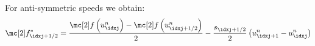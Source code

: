 \begin{corbox}\nospacing
    \begin{cor}[\hfill\tcblack{$-s^{l}_{\idxj+1/2}=s^{r}_{\idxj+1/2}=:s_{\idxj+1/2}$}\newline Symmetric Waves]\label{cor:symmetric_waves}\leavevmode\\
        For anti-symmetric speeds we obtain:
        \begin{align}
          \flux^{*}_{\idxj+1/2}=\frac{\flux\left(u_{\idxj}^{n}\right)-\flux \left(u_{\idxj+1/2}^{n}\right)}{2}-\frac{s_{\idxj+1/2}}{2}\left(u_{\idxj+1}^{n}-u_{\idxj}^{n}\right)
          \label{eq:central_scheme_symmetric_waves}
        \end{align}
    \end{cor}
\end{corbox}
